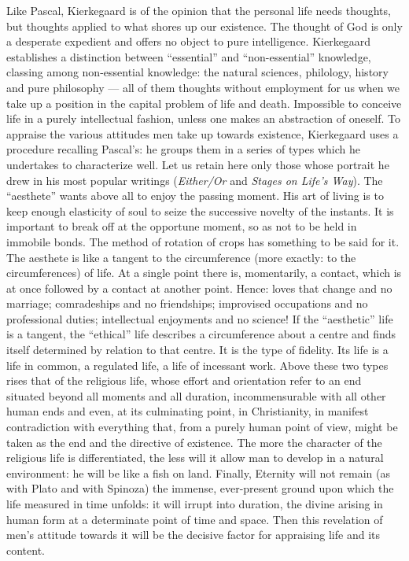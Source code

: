 \documentclass[12pt,a4paper]{article}
\newcommand{\opage}[1]{\marginnote{\footnotesize\textit{[#1]}}}
\begin{document}
Like Pascal, Kierkegaard is of the opinion that the personal life needs
thoughts, but thoughts applied to what shores up our existence. The thought of
God is only a desperate expedient and offers no object to pure intelligence.
Kierkegaard establishes a distinction between ``essential'' and ``non-essential''
knowledge, classing among non-essential knowledge: the natural sciences,
philology, history and pure philosophy --- all of them thoughts without
employment for us when we take up a position in the capital problem of life and
death. Impossible to conceive life in a purely intellectual fashion, unless one
makes an abstraction of oneself. To appraise the various attitudes men take up
towards existence, Kierkegaard uses a procedure recalling Pascal's: he groups
them in a series of types which he undertakes to characterize well. Let us
retain here only those whose portrait he drew in his most popular writings
(\emph{Either/Or} and \emph{Stages on Life's Way}). The ``aesthete'' wants
above all to enjoy the passing moment. His art of living is to keep enough
elasticity of soul to seize the successive novelty of the instants. It is
important to break off at the opportune moment, so as not to be held in
immobile bonds. The method of rotation of crops has something to be said for it.
The aesthete is like a tangent to the circumference (more exactly: to the
circumferences) of life. At a single point there is, momentarily, a contact,
which is at once followed by a contact at another point. Hence: loves that
change and no marriage; comradeships and
\opage{234}no friendships; improvised occupations and no professional duties; intellectual
enjoyments and no science! If the ``aesthetic'' life is a tangent, the
``ethical'' life describes a circumference about a centre and finds itself
determined by relation to that centre. It is the type of fidelity. Its life is a
life in common, a regulated life, a life of incessant work. Above these two
types rises that of the religious life, whose effort and orientation refer to an
end situated beyond all moments and all duration, incommensurable with all other
human ends and even, at its culminating point, in Christianity, in manifest
contradiction with everything that, from a purely human point of view, might be
taken as the end and the directive of existence. The more the character of the
religious life is differentiated, the less will it allow man to develop in a
natural environment: he will be like a fish on land. Finally, Eternity will not
remain (as with Plato and with Spinoza) the immense, ever-present ground upon
which the life measured in time unfolds: it will irrupt into duration, the
divine arising in human form at a determinate point of time and space. Then this
revelation of men's attitude towards it will be the decisive factor for
appraising life and its content.
\end{document}
